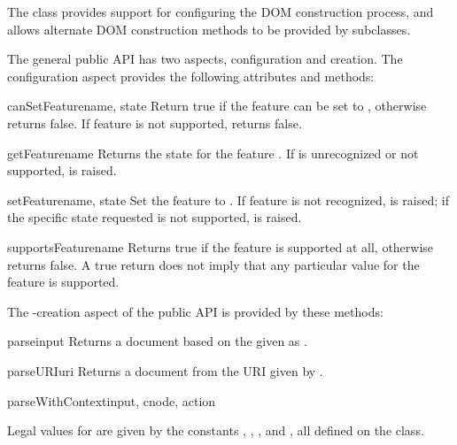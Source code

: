 \documentclass{howto}
\begin{document}
The  class provides support for configuring the DOM
construction process, and allows alternate DOM construction methods to
be provided by subclasses.

The general public API has two aspects, configuration and
 creation.  The configuration aspect provides the
following attributes and methods:

\begin{methoddesc}[DOMBuilder]{canSetFeature}{name, state}
  Return true if the feature  can be set to ,
  otherwise returns false.  If feature  is not supported,
  returns false.
\end{methoddesc}

\begin{methoddesc}[DOMBuilder]{getFeature}{name}
  Returns the state for the feature .  If  is
  unrecognized or not supported,  is
  raised.
\end{methoddesc}

\begin{methoddesc}[DOMBuilder]{setFeature}{name, state}
  Set the feature  to .  If feature  is
  not recognized,  is raised; if the
  specific state requested is not supported,
   is raised.
\end{methoddesc}

\begin{methoddesc}[DOMBuilder]{supportsFeature}{name}
  Returns true if the feature  is supported at all,
  otherwise returns false.  A true return does not imply that any
  particular value for the feature is supported.
\end{methoddesc}

The -creation aspect of the public API is provided by
these methods:

\begin{methoddesc}[DOMBuilder]{parse}{input}
  Returns a document based on the  given as
  .
\end{methoddesc}

\begin{methoddesc}[DOMBuilder]{parseURI}{uri}
  Returns a document from the URI given by .
\end{methoddesc}

\begin{methoddesc}[DOMBuilder]{parseWithContext}{input, cnode, action}

  Legal values for  are given by the constants
  , ,
  , and ,
  all defined on the  class.
\end{methoddesc}
\end{document}
